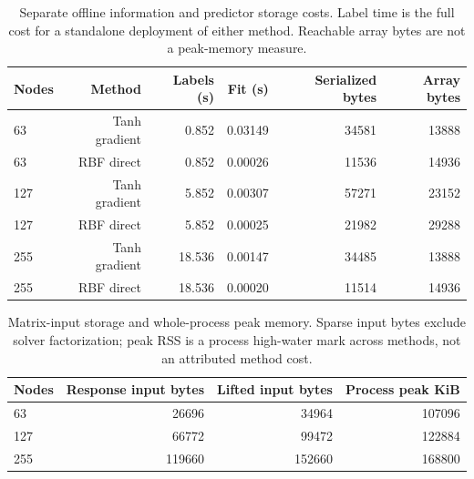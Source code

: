 \begin{table}[tbp]\centering\scriptsize
\caption{Separate offline information and predictor storage costs. Label time is the full cost for a standalone deployment of either method. Reachable array bytes are not a peak-memory measure.}
\label{tab:r24-offline}
\begin{tabular}{lrrrrr}
\toprule
Nodes & Method & Labels (s) & Fit (s) & Serialized bytes & Array bytes\\
\midrule
63 & Tanh gradient & 0.852 & 0.03149 & 34581 & 13888\\
63 & RBF direct & 0.852 & 0.00026 & 11536 & 14936\\
127 & Tanh gradient & 5.852 & 0.00307 & 57271 & 23152\\
127 & RBF direct & 5.852 & 0.00025 & 21982 & 29288\\
255 & Tanh gradient & 18.536 & 0.00147 & 34485 & 13888\\
255 & RBF direct & 18.536 & 0.00020 & 11514 & 14936\\
\bottomrule
\end{tabular}
\end{table}

\begin{table}[tbp]\centering\scriptsize
\caption{Matrix-input storage and whole-process peak memory. Sparse input bytes exclude solver factorization; peak RSS is a process high-water mark across methods, not an attributed method cost.}
\label{tab:r24-memory}
\begin{tabular}{lrrr}
\toprule
Nodes & Response input bytes & Lifted input bytes & Process peak KiB\\
\midrule
63 & 26696 & 34964 & 107096\\
127 & 66772 & 99472 & 122884\\
255 & 119660 & 152660 & 168800\\
\bottomrule
\end{tabular}
\end{table}

